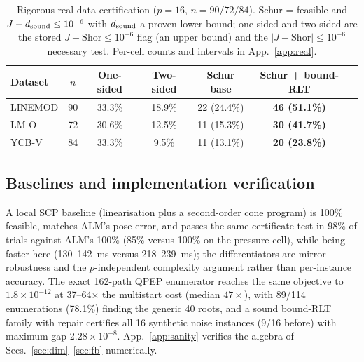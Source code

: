 \begin{table}[t]
\centering
\caption{Rigorous real-data certification ($p=16$, $n=90/72/84$). Schur = feasible and $J-d_{\rm sound}\le10^{-6}$ with $d_{\rm sound}$ a proven lower bound; one-sided and two-sided are the stored $J-\mathrm{Shor}\le10^{-6}$ flag (an upper bound) and the $|J-\mathrm{Shor}|\le10^{-6}$ necessary test. Per-cell counts and intervals in App.~\ref{app:real}.}
\label{tab:rigorous}
\scriptsize
\setlength{\tabcolsep}{1.6pt}
\begin{tabular}{@{}lcccccc@{}}
\toprule
Dataset & $n$ & One-sided & Two-sided & Schur base & Schur + bound-RLT \\
\midrule
LINEMOD & 90 & 33.3\% & 18.9\% & 22 (24.4\%) & \textbf{46 (51.1\%)} \\
LM-O & 72 & 30.6\% & 12.5\% & 11 (15.3\%) & \textbf{30 (41.7\%)} \\
YCB-V & 84 & 33.3\% & 9.5\% & 11 (13.1\%) & \textbf{20 (23.8\%)} \\
\bottomrule
\end{tabular}
\end{table}

\subsection{Baselines and implementation verification}\label{sec:baselines}
A local SCP baseline (linearisation plus a second-order cone program) is 100\% feasible, matches ALM's pose error, and passes the same certificate test in 98\% of trials against ALM's 100\% (85\% versus 100\% on the pressure cell), while being faster here (130--142~ms versus 218--239~ms); the differentiators are mirror robustness and the $p$-independent complexity argument rather than per-instance accuracy. The exact 162-path QPEP enumerator reaches the same objective to $1.8\times10^{-12}$ at 37--64$\times$ the multistart cost (median $47\times$), with 89/114 enumerations (78.1\%) finding the generic 40 roots, and a sound bound-RLT family with repair certifies all 16 synthetic noise instances (9/16 before) with maximum gap $2.28\times10^{-8}$. App.~\ref{app:sanity} verifies the algebra of Secs.~\ref{sec:dim}--\ref{sec:fb} numerically.

